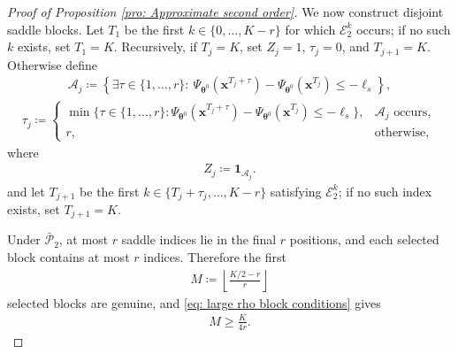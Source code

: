 \documentclass{siamart251216}
\begin{document}
\begin{proof}[Proof of Proposition \ref{pro: Approximate second order}]
    We now construct disjoint saddle blocks. Let $T_{1}$ be the first $k\in\{0,\ldots,K-r\}$ for which $\mathcal{E}_{2}^{k}$ occurs; if no such $k$ exists, set $T_{1}=K$. Recursively, if $T_j=K$, set $Z_j=1$, $\tau_j=0$, and $T_{j+1}=K$. Otherwise define
    \begin{gather*}
        \mathcal{A}_{j}\coloneqq
        \left\{\exists\tau\in\{1,\ldots,r\}:~
        \Psi_{\boldsymbol{\theta}^{0}}(\mathbf{x}^{T_j+\tau})
        -\Psi_{\boldsymbol{\theta}^{0}}(\mathbf{x}^{T_j})
        \leq-\ell_s\right\},
    \end{gather*}
    \begin{gather*}
        \tau_j\coloneqq
        \begin{cases}
            \min\{\tau\in\{1,\ldots,r\}:
            \Psi_{\boldsymbol{\theta}^{0}}(\mathbf{x}^{T_j+\tau})
            -\Psi_{\boldsymbol{\theta}^{0}}(\mathbf{x}^{T_j})\leq-\ell_s\},
            & \mathcal{A}_j\text{ occurs},\\
            r, & \text{otherwise},
        \end{cases}
    \end{gather*}
    where
    \begin{gather*}
        Z_j\coloneqq\mathbf{1}_{\mathcal{A}_j}.
    \end{gather*}
    and let $T_{j+1}$ be the first $k\in\{T_j+\tau_j,\ldots,K-r\}$ satisfying $\mathcal{E}_{2}^{k}$; if no such index exists, set $T_{j+1}=K$.

    Under $\bar{\mathcal{P}}_{2}$, at most $r$ saddle indices lie in the final $r$ positions, and each selected block contains at most $r$ indices. Therefore the first
    \begin{gather}
        \label{eq: saddle block number}
        M\coloneqq\left\lfloor\frac{K/2-r}{r}\right\rfloor
    \end{gather}
    selected blocks are genuine, and \eqref{eq: large rho block conditions} gives
    \begin{gather*}
        M\geq\frac{K}{4r}.
    \end{gather*}


\end{proof}
\end{document}
